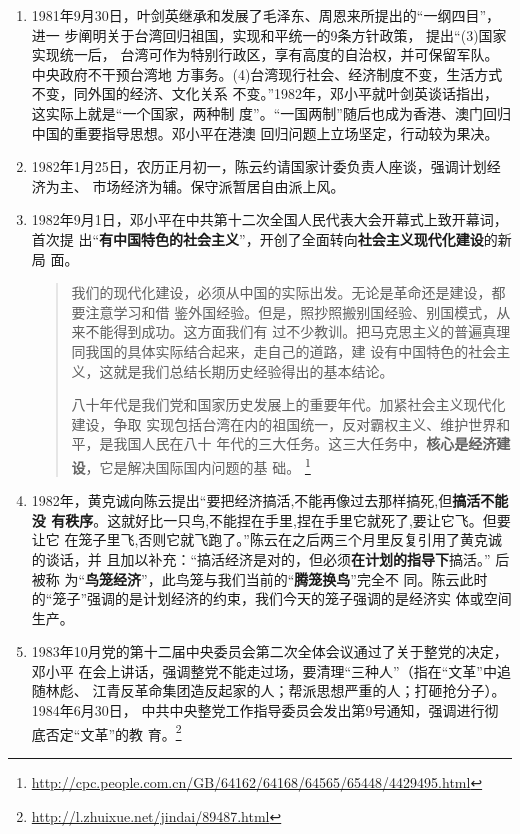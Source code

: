 \begin{enumerate}
\item 1981年9月30日，叶剑英继承和发展了毛泽东、周恩来所提出的“一纲四目”，进一
  步阐明关于台湾回归祖国，实现和平统一的9条方针政策， 提出“(3)国家实现统一后，
  台湾可作为特别行政区，享有高度的自治权，并可保留军队。中央政府不干预台湾地
  方事务。(4)台湾现行社会、经济制度不变，生活方式不变，同外国的经济、文化关系
  不变。”1982年，邓小平就叶剑英谈话指出，这实际上就是“一个国家，两种制
  度”。“一国两制”随后也成为香港、澳门回归中国的重要指导思想。邓小平在港澳
  回归问题上立场坚定，行动较为果决。

\item 1982年1月25日，农历正月初一，陈云约请国家计委负责人座谈，强调计划经济为主、
  市场经济为辅。保守派暂居自由派上风。

\item 1982年9月1日，邓小平在中共第十二次全国人民代表大会开幕式上致开幕词，首次提
  出“\textbf{有中国特色的社会主义}”，开创了全面转向\textbf{社会主义现代化建设}的新局
  面。
  \begin{quotation}
    我们的现代化建设，必须从中国的实际出发。无论是革命还是建设，都要注意学习和借
    鉴外国经验。但是，照抄照搬别国经验、别国模式，从来不能得到成功。这方面我们有
    过不少教训。把马克思主义的普遍真理同我国的具体实际结合起来，走自己的道路，建
    设有中国特色的社会主义，这就是我们总结长期历史经验得出的基本结论。

    八十年代是我们党和国家历史发展上的重要年代。加紧社会主义现代化建设，争取
    实现包括台湾在内的祖国统一，反对霸权主义、维护世界和平，是我国人民在八十
    年代的三大任务。这三大任务中，\textbf{核心是经济建设}，它是解决国际国内问题的基
    础。
    \footnote{\url{http://cpc.people.com.cn/GB/64162/64168/64565/65448/4429495.html}}
  \end{quotation}

\item 1982年，黄克诚向陈云提出“要把经济搞活,不能再像过去那样搞死,但\textbf{搞活不能没
    有秩序}。这就好比一只鸟,不能捏在手里,捏在手里它就死了,要让它飞。但要让它
  在笼子里飞,否则它就飞跑了。”陈云在之后两三个月里反复引用了黄克诚的谈话，并
  且加以补充：“搞活经济是对的，但必须\textbf{在计划的指导下}搞活。” 后被称
  为“\textbf{鸟笼经济}”\cite{chenyunjihua}，此鸟笼与我们当前的“\textbf{腾笼换鸟}”完全不
  同。陈云此时的“笼子”强调的是计划经济的约束，我们今天的笼子强调的是经济实
  体或空间生产。

\item 1983年10月党的第十二届中央委员会第二次全体会议通过了关于整党的决定，邓小平
  在会上讲话，强调整党不能走过场，要清理“三种人”（指在“文革”中追随林彪、
  江青反革命集团造反起家的人；帮派思想严重的人；打砸抢分子）。1984年6月30日，
  中共中央整党工作指导委员会发出第9号通知，强调进行彻底否定“文革”的教
  育。\footnote{\url{http://l.zhuixue.net/jindai/89487.html}}


\end{enumerate}
